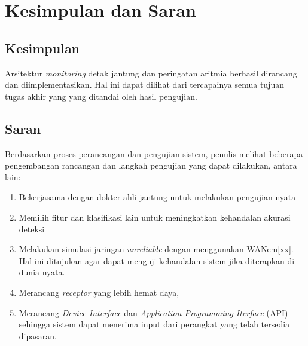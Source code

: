 \chapter{Kesimpulan dan Saran}
\section{Kesimpulan}
Arsitektur \textit{monitoring} detak jantung dan peringatan aritmia berhasil dirancang dan diimplementasikan. Hal ini dapat dilihat dari tercapainya semua tujuan tugas akhir yang yang ditandai oleh hasil pengujian.

\section{Saran}
Berdasarkan proses perancangan dan pengujian sistem, penulis melihat beberapa pengembangan rancangan dan langkah pengujian yang dapat dilakukan, antara lain:
\begin{enumerate}
	\item Bekerjasama dengan dokter ahli jantung untuk melakukan pengujian nyata
	\item Memilih fitur dan klasifikasi lain untuk meningkatkan kehandalan akurasi deteksi	
	\item Melakukan simulasi jaringan \textit{unreliable} dengan menggunakan WANem[xx]. Hal ini ditujukan agar dapat menguji kehandalan sistem jika diterapkan di dunia nyata.
	\item Merancang \textit{receptor} yang lebih hemat daya,
	\item Merancang \textit{Device Interface} dan \textit{Application Programming Iterface} (API) sehingga sistem dapat menerima input dari perangkat yang telah tersedia dipasaran.
\end{enumerate}